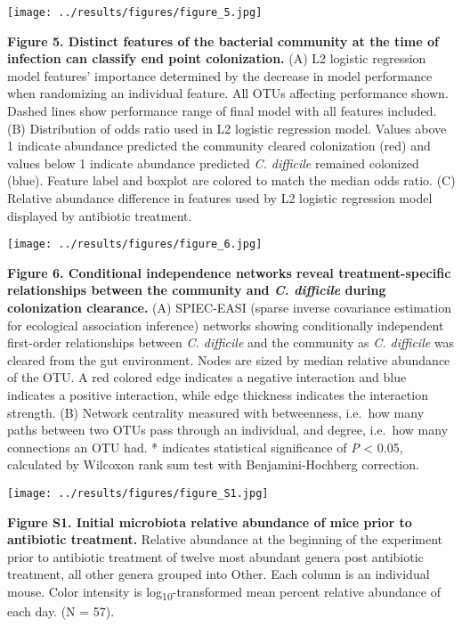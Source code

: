 \documentclass[11pt,]{article}
\begin{document}
\hfill\break

\texttt{[image: ../results/figures/figure\_5.jpg]}

\textbf{Figure 5. Distinct features of the bacterial community at the
time of infection can classify end point colonization.} (A) L2 logistic
regression model features' importance determined by the decrease in
model performance when randomizing an individual feature. All OTUs
affecting performance shown. Dashed lines show performance range of
final model with all features included. (B) Distribution of odds ratio
used in L2 logistic regression model. Values above 1 indicate abundance
predicted the community cleared colonization (red) and values below 1
indicate abundance predicted \emph{C. difficile} remained colonized
(blue). Feature label and boxplot are colored to match the median odds
ratio. (C) Relative abundance difference in features used by L2 logistic
regression model displayed by antibiotic treatment.

\hfill\break

\texttt{[image: ../results/figures/figure\_6.jpg]}

\textbf{Figure 6. Conditional independence networks reveal
treatment-specific relationships between the community and \emph{C.
difficile} during colonization clearance.} (A) SPIEC-EASI (sparse
inverse covariance estimation for ecological association inference)
networks showing conditionally independent first-order relationships
between \emph{C. difficile} and the community as \emph{C. difficile} was
cleared from the gut environment. Nodes are sized by median relative
abundance of the OTU. A red colored edge indicates a negative
interaction and blue indicates a positive interaction, while edge
thickness indicates the interaction strength. (B) Network centrality
measured with betweenness, i.e.~how many paths between two OTUs pass
through an individual, and degree, i.e.~how many connections an OTU had.
* indicates statistical significance of \emph{P} \textless{} 0.05,
calculated by Wilcoxon rank sum test with Benjamini-Hochberg correction.

\hfill\break

\texttt{[image: ../results/figures/figure\_S1.jpg]}

\textbf{Figure S1. Initial microbiota relative abundance of mice prior
to antibiotic treatment.} Relative abundance at the beginning of the
experiment prior to antibiotic treatment of twelve most abundant genera
post antibiotic treatment, all other genera grouped into Other. Each
column is an individual mouse. Color intensity is
log\textsubscript{10}-transformed mean percent relative abundance of
each day. (N = 57).
\end{document}
